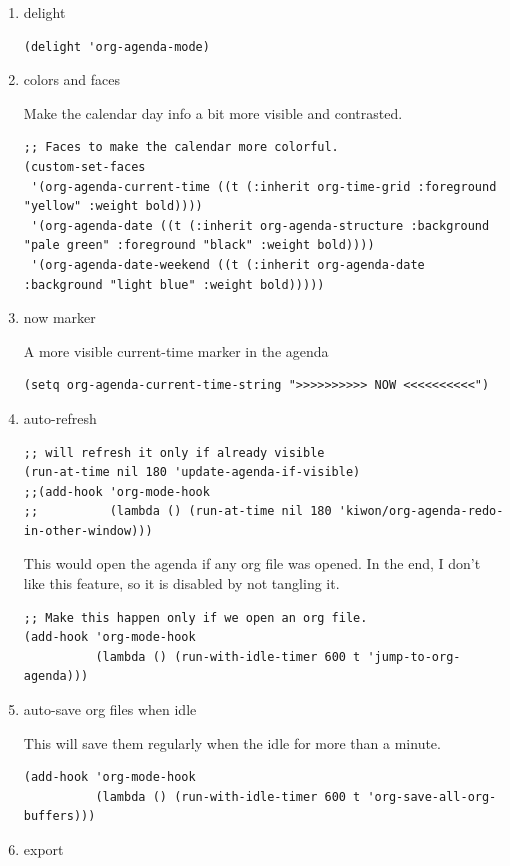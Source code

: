 \documentclass[11pt]{article}
\begin{document}
\begin{enumerate}
\begin{verbatim}
(setq org-agenda-skip-deadline-prewarning-if-scheduled 2)
\end{verbatim}
\item delight
\label{sec:org0d5ea2c}
\begin{verbatim}
(delight 'org-agenda-mode)
\end{verbatim}
\item colors and faces
\label{sec:orgf1b1a27}

Make the calendar day info a bit more visible and contrasted.

\begin{verbatim}
;; Faces to make the calendar more colorful.
(custom-set-faces
 '(org-agenda-current-time ((t (:inherit org-time-grid :foreground "yellow" :weight bold))))
 '(org-agenda-date ((t (:inherit org-agenda-structure :background "pale green" :foreground "black" :weight bold))))
 '(org-agenda-date-weekend ((t (:inherit org-agenda-date :background "light blue" :weight bold)))))
\end{verbatim}
\item now marker
\label{sec:org49b98e7}

A more visible current-time marker in the agenda

\begin{verbatim}
(setq org-agenda-current-time-string ">>>>>>>>>> NOW <<<<<<<<<<")
\end{verbatim}
\item auto-refresh
\label{sec:orgf3a25e9}

\begin{verbatim}
;; will refresh it only if already visible
(run-at-time nil 180 'update-agenda-if-visible)
;;(add-hook 'org-mode-hook
;;          (lambda () (run-at-time nil 180 'kiwon/org-agenda-redo-in-other-window)))
\end{verbatim}

This would open the agenda if any org file was opened. In the end, I
don't like this feature, so it is disabled by not tangling it.

\begin{verbatim}
;; Make this happen only if we open an org file.
(add-hook 'org-mode-hook
          (lambda () (run-with-idle-timer 600 t 'jump-to-org-agenda)))
\end{verbatim}
\item auto-save org files when idle
\label{sec:org5bbf496}

This will save them regularly when the idle for more than a minute.

\begin{verbatim}
(add-hook 'org-mode-hook
          (lambda () (run-with-idle-timer 600 t 'org-save-all-org-buffers)))
\end{verbatim}
\item export
\label{sec:orge6c8f30}


\end{enumerate}
\end{document}
